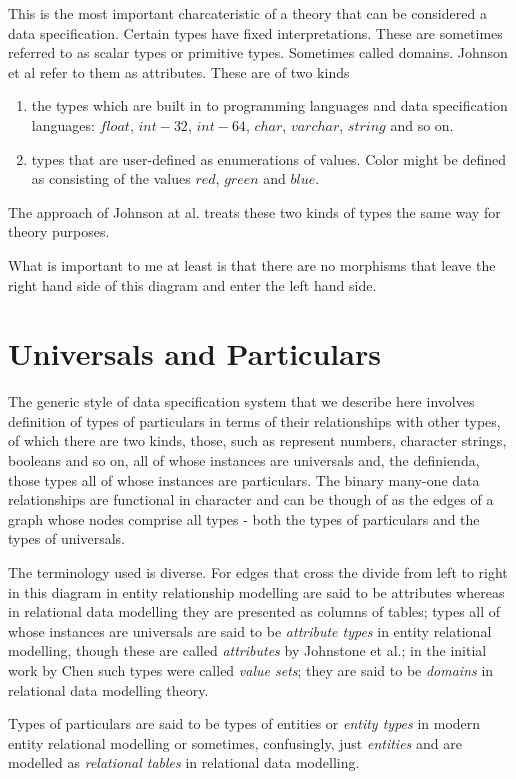 \documentclass[10pt,a4paper]{article}
\theoremstyle{remark}
\begin{document}
This is the most important charcateristic of a theory that can be considered a data specification. 
Certain types have fixed interpretations. These are sometimes referred to as scalar types or primitive types.
Sometimes called domains. Johnson et al refer to them as attributes.
These are of two kinds
\begin{enumerate}
\item the types which are built in to programming languages and data specification languages:  $float$, $int-32$, $int-64$, $char$, $varchar$, $string$ and so on.
\item types that are user-defined as enumerations of values. Color might be defined as 
consisting of the values $red$, $green$ and $blue$. 
\end{enumerate}

The approach of Johnson at al. treats these two kinds of types the same way for theory purposes. 

What is important to me at least is that there are no morphisms that leave the right hand side of this diagram and enter the left hand side.


\section{Universals and Particulars}
The generic style of data specification system
that we describe here involves definition of types of particulars in terms of their relationships with other types,
of which there are two kinds, those, such as represent numbers, character strings, booleans and so on, all of
whose instances are universals and, the definienda, those types all of whose instances are particulars. The binary many-one data relationships  are functional in character and can be though of as the edges of a graph whose nodes comprise all types - both the types of particulars and the types of universals. 


The terminology used is diverse. For edges that cross the divide from left to right in this diagram 
in entity relationship modelling 
are said to be attributes whereas in relational data modelling they are presented as columns of tables; types all of whose instances are universals  are said to be \textit{attribute types} in entity relational 
modelling, though  these are called \textit{attributes} by Johnstone et al.; in the initial work by  Chen such types were called \textit{value sets}; they are said to be \textit{domains} in relational data modelling theory. 

\newcommand{\Veee}{V}
\newcommand{\veee}{v}
Types of particulars are said to be 
types of entities or \textit{entity types} in modern entity relational modelling
or sometimes, confusingly, just \textit{entities}  and 
are modelled as \textit{relational tables} in relational data modelling. 
\end{document}
